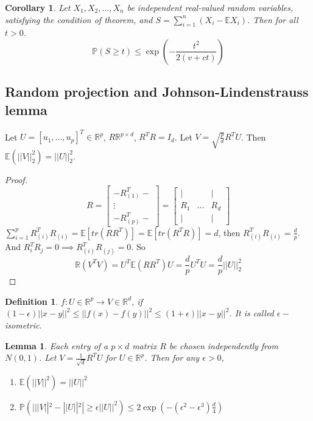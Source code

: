 \documentclass[11pt]{article}
\def\BP{{\bf P}}
\def\BR{{\mathbb R}}
\def\BE{{\mathbb E}}
\def\BP{{\mathbb P}}
\newtheorem{lemma}{Lemma}[section]
\newtheorem{definition}{Definition}[section]
\newtheorem{corollary}{Corollary}[section]
\begin{document}
\begin{corollary}
Let $X_1, X_2, ..., X_n$ be independent real-valued random variables, satisfying the condition of theorem, and $S = \sum_{i=1}^{n} (X_i - \BE X_i)$. Then for all $t > 0$.
\[
\BP(S \geq t) \leq \exp(-\frac{t^2}{2(v+ct)})
\]
\end{corollary}

\subsection{Random projection and Johnson-Lindenstrauss lemma}

Let $U = [u_1, ..., u_p]^T \in \BR^p$, $R \BR^{p \times d}$, $R^T R = I_d$. Let $V = \sqrt{\frac{p}{d}} R^T U$. Then $\BE (||V||_2^2) = ||U||_2^2$.

\begin{proof}
\[
R = \begin{bmatrix}
- R_{(1)}^T  -\\
\vdots \\
-R_{(p)}^T -
\end{bmatrix}
= \begin{bmatrix}
| & & | \\
R_1 & ... & R_d \\
| & & |
\end{bmatrix}
\]
$\sum_{i=1}^p R_{(i)}^T R_{(i)} =  \BE [tr(RR^T)] = \BE [tr(R^T R)] = d$, then $R_{(i)}^T R_{(i)} = \frac{d}{p}$. And $R_i^T R_j = 0 \implies R_{(i)}^T R_{(j)} = 0$.
So
\[
	\BR (V^T V) = U^T \BE (RR^T) U = \frac{d}{p} U^T U = \frac{d}{p}||U||_2^2
\]
\end{proof}

\begin{definition}
$f: U \in \BR^p \to V \in \BR^d $, if $(1-\epsilon)||x - y||^2 \leq ||f(x) - f(y)||^2 \leq (1 + \epsilon) ||x - y||^2$. It is called $\epsilon-$isometric.
\end{definition}

\begin{lemma}
Each entry of a $p\times d$ matrix $R$ be chosen independently from $N(0, 1)$. Let $V = \frac{1}{\sqrt{d}} R^T U$ for $U \in \BR^p$. Then for any $\epsilon > 0$,
\begin{enumerate}
\item $\BE(||V||^2) = ||U||^2$
\item $\BP( | ||V||^2 - ||U||^2 | \geq \epsilon ||U||^2 ) \leq 2 \exp(-(\epsilon^2 - \epsilon^3)\frac{d}{4})$
\end{enumerate}
\end{lemma}
\end{document}
